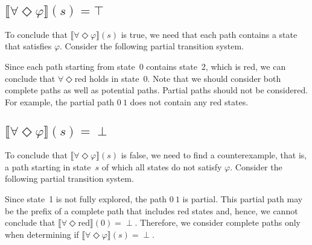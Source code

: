 \documentclass[12pt]{article}
\newcommand{\eventually}{\Diamond}
\theoremstyle{definition}
\newcommand{\satisfaction}[1]{\llbracket #1 \rrbracket}
\newenvironment{franck}{\color{red}}{\color{black}}
\begin{document}
\begin{franck}
\subsection*{$\satisfaction{\forall \eventually \varphi}(s) = \top$}

To conclude that $\satisfaction{\forall \eventually \varphi}(s)$ is true, we need that each path contains a state that satisfies $\varphi$.  Consider the following partial transition system.
\begin{center}
\end{center}
Since each path starting from state~0 contains state~2, which is red, we can conclude that $\forall \eventually \mbox{red}$ holds in state~0.  Note that we should consider both complete paths as well as potential paths.  Partial paths should not be considered.  For example, the partial path $0\ 1$ does not contain any red states.

\subsection*{$\satisfaction{\forall \eventually \varphi}(s) = \perp$}

To conclude that $\satisfaction{\forall \eventually \varphi}(s)$ is false, we need to find a counterexample, that is, a path starting in state~$s$ of which all states do not satisfy $\varphi$.  Consider the following partial transition system.
\begin{center}
\end{center}
Since state~1 is not fully explored, the path $0\ 1$ is partial.  This partial path may be the prefix of a complete path that includes red states and, hence, we cannot conclude that $\satisfaction{\forall \eventually \mbox{red}}(0) = \perp$.  Therefore, we consider complete paths only when determining if $\satisfaction{\forall \eventually \varphi}(s) = \perp$.


\end{franck}
\end{document}
